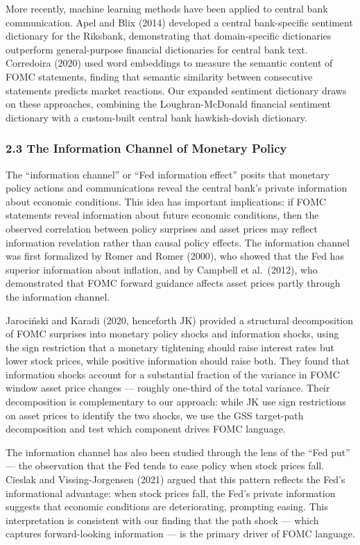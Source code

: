 \documentclass[12pt]{article}
\begin{document}
More recently, machine learning methods have been applied to central
bank communication. Apel and Blix (2014) developed a central
bank-specific sentiment dictionary for the Riksbank, demonstrating that
domain-specific dictionaries outperform general-purpose financial
dictionaries for central bank text. Corredoira (2020) used word
embeddings to measure the semantic content of FOMC statements, finding
that semantic similarity between consecutive statements predicts market
reactions. Our expanded sentiment dictionary draws on these approaches,
combining the Loughran-McDonald financial sentiment dictionary with a
custom-built central bank hawkish-dovish dictionary.

\subsubsection{2.3 The Information Channel of Monetary
Policy}\label{the-information-channel-of-monetary-policy}

The ``information channel'' or ``Fed information effect'' posits that
monetary policy actions and communications reveal the central bank's
private information about economic conditions. This idea has important
implications: if FOMC statements reveal information about future
economic conditions, then the observed correlation between policy
surprises and asset prices may reflect information revelation rather
than causal policy effects. The information channel was first formalized
by Romer and Romer (2000), who showed that the Fed has superior
information about inflation, and by Campbell et al.~(2012), who
demonstrated that FOMC forward guidance affects asset prices partly
through the information channel.

Jarociński and Karadi (2020, henceforth JK) provided a structural
decomposition of FOMC surprises into monetary policy shocks and
information shocks, using the sign restriction that a monetary
tightening should raise interest rates but lower stock prices, while
positive information should raise both. They found that information
shocks account for a substantial fraction of the variance in FOMC window
asset price changes --- roughly one-third of the total variance. Their
decomposition is complementary to our approach: while JK use sign
restrictions on asset prices to identify the two shocks, we use the GSS
target-path decomposition and test which component drives FOMC language.

The information channel has also been studied through the lens of the
``Fed put'' --- the observation that the Fed tends to ease policy when
stock prices fall. Cieslak and Vissing-Jorgensen (2021) argued that this
pattern reflects the Fed's informational advantage: when stock prices
fall, the Fed's private information suggests that economic conditions
are deteriorating, prompting easing. This interpretation is consistent
with our finding that the path shock --- which captures forward-looking
information --- is the primary driver of FOMC language.
\end{document}
